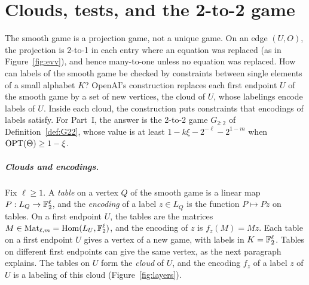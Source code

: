 \chapter{Clouds, tests, and the 2-to-2 game}\label{ch:inner}

The smooth game is a projection game, not a unique game. On an edge $(U,O)$, the projection is 2-to-1 in each entry where an equation was replaced (as in Figure~\ref{fig:evv}), and hence many-to-one unless no equation was replaced. How can labels of the smooth game be checked by constraints between single elements of a small alphabet $K$? OpenAI's construction replaces each first endpoint $U$ of the smooth game by a set of new vertices, the cloud of $U$, whose labelings encode labels of $U$. Inside each cloud, the construction puts constraints that encodings of labels satisfy. For Part~I, the answer is the 2-to-2 game $G_{2:2}$ of Definition~\ref{def:G22}, whose value is at least $1-k\xi-2^{-\ell}-2^{1-m}$ when $\operatorname{OPT}(\Theta)\ge1-\xi$.

\paragraph{Clouds and encodings.}\label{nt:clouds} Fix $\ell\ge1$. A \emph{table} on a vertex $Q$ of the smooth game is a linear map $P:L_Q\to\mathbb{F}_2^\ell$, and the \emph{encoding} of a label $z\in L_Q$ is the function $P\mapsto Pz$ on tables. On a first endpoint $U$, the tables are the matrices $M\in\operatorname{Mat}_{\ell,m}=\operatorname{Hom}(L_U,\mathbb{F}_2^\ell)$, and the encoding of $z$ is $f_z(M)=Mz$. Each table on a first endpoint $U$ gives a vertex of a new game, with labels in $K=\mathbb{F}_2^\ell$. Tables on different first endpoints can give the same vertex, as the next paragraph explains. The tables on $U$ form the \emph{cloud} of $U$, and the encoding $f_z$ of a label $z$ of $U$ is a labeling of this cloud (Figure~\ref{fig:layers}).

